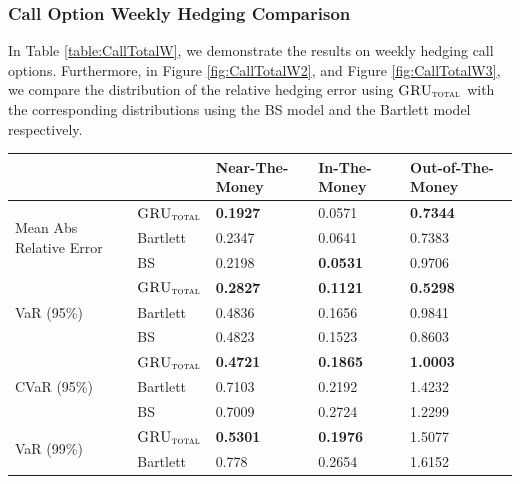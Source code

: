 \documentclass[letterpaper,12pt,titlepage,oneside,final]{book}
\numberwithin{equation}{section}
\theoremstyle{definition}
\newcommand{\modelT}{\textsc{GRU}_{\textsc{total}}}
\begin{document}
\subsubsection{Call Option Weekly Hedging Comparison}
In Table \ref{table:CallTotalW}, we demonstrate the results on weekly hedging call options. Furthermore, in  Figure \ref{fig:CallTotalW2}, and  Figure \ref{fig:CallTotalW3}, we compare the distribution of the relative hedging error using  $\modelT$ with the corresponding distributions using the BS model and the Bartlett model respectively.
\begin{table}[htp!]
	\centering
	\begin{tabular}{ll|l|l|l|}
		\cline{3-5}
		&          & Near-The-Money   & In-The-Money     & Out-of-The-Money \\ \hline
		\multicolumn{1}{|l|}{\multirow{3}{*}{Mean Abs Relative Error}} & $\modelT$    & \textbf{0.1927}  & 0.0571  & \textbf{0.7344}  \\  
		\multicolumn{1}{|l|}{}                                & Bartlett & 0.2347           & 0.0641           & 0.7383           \\  
		\multicolumn{1}{|l|}{}                                & BS       & 0.2198           &\textbf{0.0531}           & 0.9706           \\ \hline
		\multicolumn{1}{|l|}{\multirow{3}{*}{VaR (95\%)}}     & $\modelT$    & \textbf{0.2827} & \textbf{0.1121} & \textbf{0.5298} \\  
		\multicolumn{1}{|l|}{}                                & Bartlett & 0.4836          & 0.1656          & 0.9841          \\  
		\multicolumn{1}{|l|}{}                                & BS       & 0.4823          & 0.1523          & 0.8603          \\ \hline
		\multicolumn{1}{|l|}{\multirow{3}{*}{CVaR (95\%)}}    & $\modelT$    & \textbf{0.4721} & \textbf{0.1865} & \textbf{1.0003} \\  
		\multicolumn{1}{|l|}{}                                & Bartlett & 0.7103          & 0.2192          & 1.4232          \\  
		\multicolumn{1}{|l|}{}                                & BS       & 0.7009          & 0.2724          & 1.2299          \\ \hline
		\multicolumn{1}{|l|}{\multirow{3}{*}{VaR (99\%)}}     & $\modelT$    & \textbf{0.5301} & \textbf{0.1976} & 1.5077          \\  
		\multicolumn{1}{|l|}{}                                & Bartlett & 0.778           & 0.2654          & 1.6152          \\  

\end{tabular}
\end{table}
\end{document}
